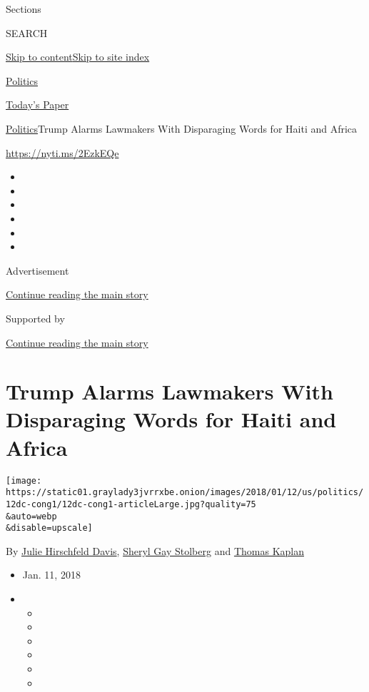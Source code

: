 Sections

SEARCH

\protect\hyperlink{site-content}{Skip to
content}\protect\hyperlink{site-index}{Skip to site index}

\href{https://www.nytimes3xbfgragh.onion/section/politics}{Politics}

\href{https://myaccount.nytimes3xbfgragh.onion/auth/login?response_type=cookie\&client_id=vi}{}

\href{https://www.nytimes3xbfgragh.onion/section/todayspaper}{Today's
Paper}

\href{/section/politics}{Politics}\textbar{}Trump Alarms Lawmakers With
Disparaging Words for Haiti and Africa

\url{https://nyti.ms/2EzkEQe}

\begin{itemize}
\item
\item
\item
\item
\item
\item
\end{itemize}

Advertisement

\protect\hyperlink{after-top}{Continue reading the main story}

Supported by

\protect\hyperlink{after-sponsor}{Continue reading the main story}

\hypertarget{trump-alarms-lawmakers-with-disparaging-words-for-haiti-and-africa}{%
\section{Trump Alarms Lawmakers With Disparaging Words for Haiti and
Africa}\label{trump-alarms-lawmakers-with-disparaging-words-for-haiti-and-africa}}

\texttt{[image: https://static01.graylady3jvrrxbe.onion/images/2018/01/12/us/politics/12dc-cong1/12dc-cong1-articleLarge.jpg?quality=75\\\&auto=webp\\\&disable=upscale]}

By
\href{https://www.nytimes3xbfgragh.onion/by/julie-hirschfeld-davis}{Julie
Hirschfeld Davis},
\href{http://www.nytimes3xbfgragh.onion/by/sheryl-gay-stolberg}{Sheryl
Gay Stolberg} and
\href{http://www.nytimes3xbfgragh.onion/by/thomas-kaplan}{Thomas Kaplan}

\begin{itemize}
\item
  Jan. 11, 2018
\item
  \begin{itemize}
  \item
  \item
  \item
  \item
  \item
  \item
  \end{itemize}
\end{itemize}

